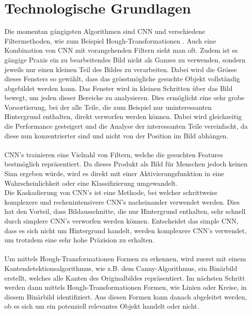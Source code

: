 \section{Technologische Grundlagen}
\label{sec:technicalBase}
Die momentan gängigsten Algorithmen sind \gls{CNN} \parencite{li2015convolutional} und verschiedene Filtermethoden, wie zum Beispiel Hough-Transformationen \parencite{ye2015new}. Auch eine Kombination von \gls{CNN} mit vorangehenden Filtern sieht man oft. Zudem ist es gängige Praxis ein zu bearbeitendes Bild nicht als Ganzes zu verwenden, sondern jeweils nur einen kleinen Teil des Bildes zu verarbeiten. Dabei wird die Grösse dieses Fensters so gewählt, dass das grösstmögliche gesuchte Objekt vollständig abgebildet werden kann. Das Fenster wird in kleinen Schritten über das Bild bewegt, um jeden dieser Bereiche zu analysieren. Dies ermöglicht eine sehr grobe Vorsortierung, bei der alle Teile, die zum Beispiel nur uninteressanten Hintergrund enthalten, direkt verworfen werden können. Dabei wird gleichzeitig die Performance gesteigert und die Analyse der interessanten Teile vereinfacht, da diese nun konzentrierter sind und nicht von der Position im Bild abhängen.\\
\\
\gls{CNN}’s trainieren eine Vielzahl von Filtern, welche die gesuchten Features bestmöglich repräsentiert. Da dieses Produkt als Bild für Menschen jedoch keinen Sinn ergeben würde, wird es direkt mit einer Aktivierungsfunktion in eine Wahrscheinlichkeit oder eine Klassifizierung umgewandelt.\\
Die Kaskadierung von \gls{CNN}’s ist eine Methode, bei welcher schrittweise komplexere und rechenintensivere \gls{CNN}’s nacheinander verwendet werden. Dies hat den Vorteil, dass Bildausschnitte, die nur Hintergrund enthalten, sehr schnell durch simplere \gls{CNN}'s verworfen werden können. Entscheidet das simple \gls{CNN}, dass es sich nicht um Hintergrund handelt, werden komplexere \gls{CNN}’s verwendet, um trotzdem eine sehr hohe Präzision zu erhalten.\\
\\
Um mittels Hough-Transformationen Formen zu erkennen, wird zuerst mit einem Kantendetektionsalgorithmus, wie z.B. dem Canny-Algorithmus, ein Binärbild erstellt, welches alle Kanten des Originalbildes repräsentiert. Im nächsten Schritt werden dann mittels Hough-Transformationen Formen, wie Linien oder Kreise, in diesem Binärbild identifiziert. Aus diesen Formen kann danach abgeleitet werden, ob es sich um ein potenziell relevantes Objekt handelt oder nicht.\\
